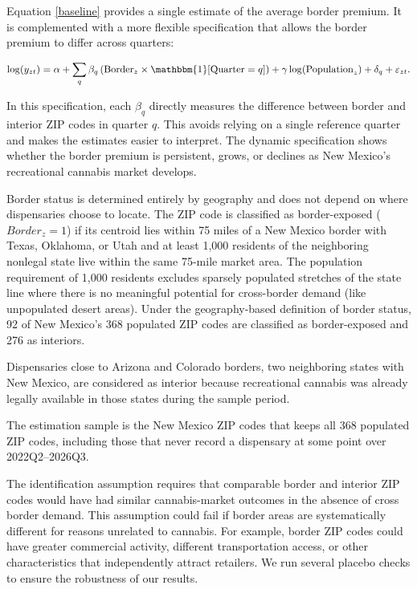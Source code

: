 \documentclass[12pt]{article}
\begin{document}
Equation \ref{baseline} provides a single estimate of the average border premium. It is complemented with a more flexible specification that allows the border premium to differ across quarters:

\begin{equation}
\label{baseline_dynamic}
\log(y_{zt})=
\alpha
+
\sum_q
\beta_q
\left(
\text{Border}_z
\times
\mathbbm{1}[\text{Quarter}=q]
\right)
+
\gamma \log(\text{Population}_z)
+
\delta_q
+
\varepsilon_{zt}.
\end{equation}

In this specification, each \(\beta_q\) directly measures the difference between border and interior ZIP codes in quarter \(q\). This avoids relying on a single reference quarter and makes the estimates easier to interpret. The dynamic specification shows whether the border premium is persistent, grows, or declines as New Mexico's recreational cannabis market develops.

Border status is determined entirely by geography and does not depend on where dispensaries choose to locate. The ZIP code is classified as border-exposed ($Border_z=1$) if its centroid lies within 75 miles of a New Mexico border with Texas, Oklahoma, or Utah and at least 1,000 residents of the neighboring nonlegal state live within the same 75-mile market area. The population requirement of 1,000 residents excludes sparsely populated stretches of the state line where there is no meaningful potential for cross-border demand (like unpopulated desert areas).
Under the geography-based definition of border status, 92 of New Mexico's 368 populated ZIP codes are classified as border-exposed and 276 as interiors.

Dispensaries close to Arizona and Colorado borders, two neighboring states with New Mexico, are considered as interior because recreational cannabis was already legally available in those states during the sample period.

The estimation sample is the New Mexico ZIP codes that keeps all 368 populated ZIP codes, including those that never record a dispensary at some point over 2022Q2--2026Q3. 

The identification assumption requires that comparable border and interior ZIP codes would have had similar cannabis-market outcomes in the absence of cross border demand. This assumption could fail if border areas are systematically different for reasons unrelated to cannabis. For example, border ZIP codes could have greater commercial activity, different transportation access, or other characteristics that independently attract retailers. We run several placebo checks to ensure the robustness of our results.
\end{document}
